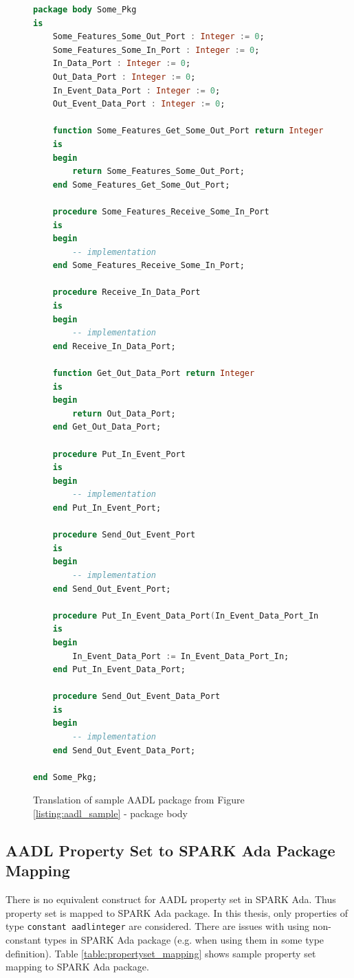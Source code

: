 \begin{figure}[ht]
\singlespacing
\begin{lstlisting}[language=ada, frame=single, gobble=0]
package body Some_Pkg
is
    Some_Features_Some_Out_Port : Integer := 0;
    Some_Features_Some_In_Port : Integer := 0;
    In_Data_Port : Integer := 0;
    Out_Data_Port : Integer := 0;
    In_Event_Data_Port : Integer := 0;
    Out_Event_Data_Port : Integer := 0;

    function Some_Features_Get_Some_Out_Port return Integer
    is
    begin
        return Some_Features_Some_Out_Port;
    end Some_Features_Get_Some_Out_Port;

    procedure Some_Features_Receive_Some_In_Port
    is
    begin
        -- implementation
    end Some_Features_Receive_Some_In_Port;

    procedure Receive_In_Data_Port
    is
    begin
        -- implementation
    end Receive_In_Data_Port;

    function Get_Out_Data_Port return Integer
    is
    begin
        return Out_Data_Port;
    end Get_Out_Data_Port;

    procedure Put_In_Event_Port
    is
    begin
        -- implementation
    end Put_In_Event_Port;

    procedure Send_Out_Event_Port
    is
    begin
        -- implementation
    end Send_Out_Event_Port;

    procedure Put_In_Event_Data_Port(In_Event_Data_Port_In : Integer)
    is
    begin
        In_Event_Data_Port := In_Event_Data_Port_In;
    end Put_In_Event_Data_Port;

    procedure Send_Out_Event_Data_Port
    is
    begin
        -- implementation
    end Send_Out_Event_Data_Port;

end Some_Pkg;
\end{lstlisting}
\doublespacing
\caption{Translation of sample AADL package from Figure \ref{listing:aadl_sample} - package body}
\label{listing:package_mapping_body}
\end{figure}



\subsection{AADL Property Set to SPARK Ada Package Mapping}
\label{codegen:mapping:propertyset}

There is no equivalent construct for AADL property set in SPARK Ada. Thus property set is mapped to SPARK Ada package. In this thesis, only properties of type \lstinline{constant aadlinteger} are considered. There are issues with using non-constant types in SPARK Ada package (e.g. when using them in some type definition). Table \ref{table:propertyset_mapping} shows sample property set mapping to SPARK Ada package.

